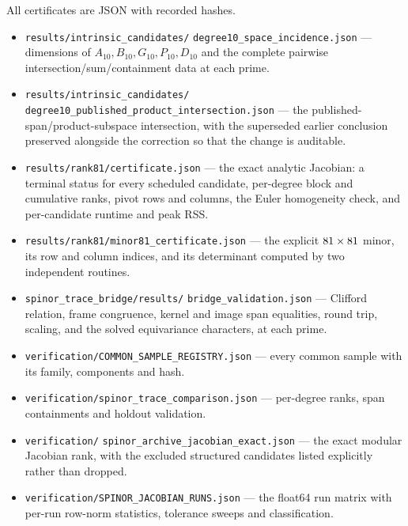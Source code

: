 All certificates are JSON with recorded hashes.

\begin{itemize}
\item \texttt{results/intrinsic\_candidates/}\allowbreak
      \texttt{degree10\_space\_incidence.json} ---
      dimensions of $A_{10},B_{10},G_{10},P_{10},D_{10}$ and the complete
      pairwise intersection/sum/containment data at each prime.
\item \texttt{results/intrinsic\_candidates/}\allowbreak
      \texttt{degree10\_published\_}\allowbreak\texttt{product\_intersection.json}
      --- the published-span/product-subspace intersection, with the superseded
      earlier conclusion preserved alongside the correction so that the change is
      auditable.
\item \texttt{results/rank81/certificate.json} --- the exact analytic Jacobian:
      a terminal status for every scheduled candidate, per-degree block and
      cumulative ranks, pivot rows and columns, the Euler homogeneity check, and
      per-candidate runtime and peak RSS.
\item \texttt{results/rank81/minor81\_certificate.json} --- the explicit
      $81\times81$ minor, its row and column indices, and its
      determinant computed by two independent routines.
\item \texttt{spinor\_trace\_bridge/results/}\allowbreak
      \texttt{bridge\_validation.json} --- Clifford
      relation, frame congruence, kernel and image span equalities, round trip,
      scaling, and the solved equivariance characters, at each prime.
\item \texttt{verification/COMMON\_SAMPLE\_REGISTRY.json} --- every common sample
      with its family, components and hash.
\item \texttt{verification/spinor\_trace\_comparison.json} --- per-degree ranks,
      span containments and holdout validation.
\item \texttt{verification/}\allowbreak
      \texttt{spinor\_archive\_jacobian\_exact.json} --- the exact
      modular Jacobian rank, with the excluded structured candidates listed
      explicitly rather than dropped.
\item \texttt{verification/SPINOR\_JACOBIAN\_RUNS.json} --- the float64 run
      matrix with per-run row-norm statistics, tolerance sweeps and
      classification.
\end{itemize}
